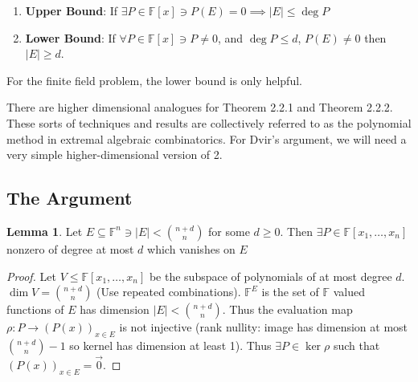 \documentclass{article}
\newcommand*{\subeq}{\subseteq}
\newcommand{\F}{\mathbb{F}}
\newcommand{\abs}[1]{\left\lvert #1\right\rvert}
\theoremstyle{definition}
\newtheorem{lemma}{Lemma}[section]
\begin{document}
\begin{enumerate}
    \item \textbf{Upper Bound}: If $\exists P \in \F[x] \ni P(E) = 0 \implies \abs{E} \leq \deg P$
    \item \textbf{Lower Bound}: If $\forall P \in \F[x] \ni P \neq 0$, and  $\deg P \leq d$, $P(E) \neq 0$ then $\abs{E} \geq d$.   
\end{enumerate}

For the finite field problem, the lower bound is only helpful. 

There are higher dimensional analogues for Theorem 2.2.1 and Theorem 2.2.2. These sorts of techniques and results are collectively referred to as the polynomial method in extremal algebraic combinatorics. For Dvir’s argument, we will need a very simple higher-dimensional version of 2.

\subsection{The Argument}

\begin{lemma}
    Let $E \subeq \F^n \ni \abs{E} < {n + d\choose n}$ for some $d \geq 0$. Then $\exists P \in \F[x_1, \dots, x_n]$ nonzero of degree at most $d$ which vanishes on $E$     
\end{lemma}
\begin{proof}
    Let $V \leq \F[x_1, \dots, x_n]$ be the subspace of polynomials of at most degree $d$. $\dim V = {n + d\choose n}$ (Use repeated combinations). $\F^E$ is the set of $\F$ valued functions of $E$ has dimension $\abs{E} < {n + d\choose n}$. Thus the evaluation map $\rho : P \to (P(x))_{x \in E}$ is not injective (rank nullity: image has dimension at most ${n + d\choose n} - 1$ so kernel has dimension at least 1). Thus $\exists P \in \ker \rho$ such that $(P(x))_{x \in E} = \vec{0}$.             
\end{proof}

\bigskip
\end{document}
